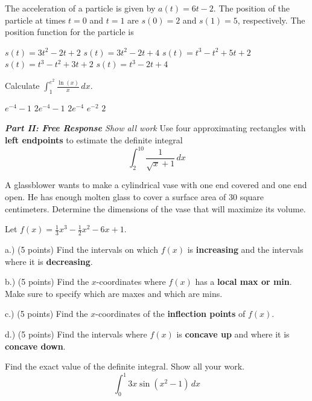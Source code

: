 \documentclass[11pt]{article}
\begin{document}
\begin{questions}
\begin{multiplechoice}{5}
\question The acceleration of a particle is given by $a(t) = 6t - 2$.  The position
of the particle at times $t = 0$ and $t = 1$ are $s(0) = 2$ and $s(1) = 5$, respectively.  
The position function for the particle is
\begin{answers}{2}
\ans $s(t) = 3t^2 - 2t + 2$
\ans $s(t) = 3t^2 - 2t + 4$
\ans $s(t) = t^3 - t^2 + 5t + 2$
\ans $s(t) = t^3 - t^2 + 3t + 2$
\ans $s(t) = t^3 - 2t + 4$
\end{answers}

\question Calculate $\int_1^{e^2} \frac{\ln(x)}{x} \, dx$.
\begin{answers}{2}
\ans $e^{-4} - 1$ 
\ans $2e^{-4} - 1$
\ans $2e^{-4}$
\ans $e^{-2}$
\ans $2$
\end{answers}

\end{multiplechoice}
\vspace{.2in}

\newpage

\noindent \emph{{\bf Part II: Free Response}{  Show all work}}
\question[10] Use four approximating rectangles with \textbf{left endpoints} to
estimate the definite integral
$$\int_2^{10} \frac{1}{\sqrt{x} + 1} \, dx$$


\newpage


\question[12] A glassblower wants to make a cylindrical vase with one end covered and one end open.  He has enough molten glass to cover a surface area of 30 square centimeters.  Determine the dimensions of the vase that will maximize its volume.

\newpage


\question[20]  Let $f(x) = \frac{1}{3}x^3 - \frac{1}{2}x^2 - 6x  + 1$.

a.) (5 points) Find the intervals on which $f(x)$ is
 \textbf{increasing} and the intervals where it is 
\textbf{decreasing}.

\vspace{2in}


b.) (5 points) Find the $x$-coordinates where $f(x)$
has a \textbf{local max or min}.  Make sure to
specify which are maxes and which are mins.

\vspace{2in}

c.) (5 points) Find the $x$-coordinates of the \textbf{inflection
points} of $f(x)$.

\vspace{2in}

d.)  (5 points) Find the intervals where
$f(x)$ is \textbf{concave up} and where it is
\textbf{concave down}.

\newpage

\question[10]  Find the exact value of the definite integral. Show all your work.
$$\int_0^1 3x \sin(x^2 -1) \, dx$$


\mbox{}
\end{questions}
\end{document}
